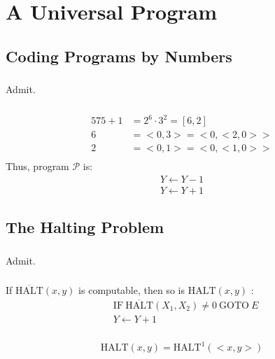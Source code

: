\chapter{A Universal Program}


\section{Coding Programs by Numbers}

\subsection{}
Admit.

\subsection{}
\begin{align*}
  575+1 & = 2^6 \cdot 3^2 = [6,2] \\
  6     & = <0,3> = <0,<2,0>> \\
  2     & = <0,1> = <0,<1,0>> \\
\end{align*}
Thus, program $\mathscr{P}$ is:
\begin{align*}
  Y \gets Y - 1 \\
  Y \gets Y + 1
\end{align*}



\section{The Halting Problem}

\subsection{}
Admit.

\subsection{}
If $ \mathrm{\overline{HALT}}(x,y) $ is computable, then so is 
$ \mathrm{HALT}(x,y)$ :
\begin{align*}
  & \mathrm{IF}\ \mathrm{\overline{HALT}}(X_1,X_2)\neq 0  \ \mathrm{GOTO}\ E \\
  & Y \gets Y + 1
\end{align*}


\subsection{}
\[ \mathrm{HALT}(x,y) = \mathrm{HALT}^1(<x,y>) \]


